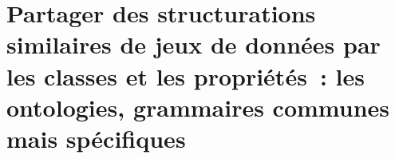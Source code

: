 \chapter{\label{II-B}Partager des structurations similaires de jeux de données par les classes et les propriétés : les ontologies, grammaires communes mais spécifiques}
